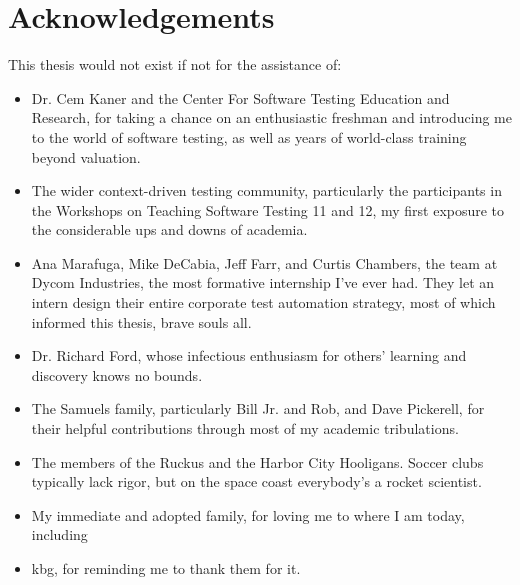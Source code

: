 \chapter*{Acknowledgements}
This thesis would not exist if not for the assistance of:
\begin{itemize}
    \item Dr. Cem Kaner and the Center For Software Testing Education and Research, for taking a chance on an enthusiastic freshman and introducing me to the world of software testing, as well as years of world-class training beyond valuation.

    \item The wider context-driven testing community, particularly the participants in the Workshops on Teaching Software Testing 11 and 12, my first exposure to the considerable ups and downs of academia.

    \item Ana Marafuga, Mike DeCabia, Jeff Farr, and Curtis Chambers, the team at Dycom Industries, the most formative internship I've ever had. They let an intern design their entire corporate test automation strategy, most of which informed this thesis, brave souls all.

    \item Dr. Richard Ford, whose infectious enthusiasm for others' learning and discovery knows no bounds.

    \item The Samuels family, particularly Bill Jr. and Rob, and Dave Pickerell, for their helpful contributions through most of my academic tribulations.
    
    \item The members of the Ruckus and the Harbor City Hooligans. Soccer clubs typically lack rigor, but on the space coast everybody's a rocket scientist.

    \item My immediate and adopted family, for loving me to where I am today, including

    \item kbg, for reminding me to thank them for it.
\end{itemize}